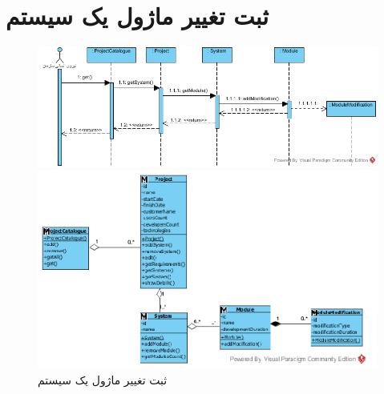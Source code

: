 \section{ثبت تغییر ماژول یک سیستم}
\begin{figure}[H]
	\centering
	\includegraphics[scale=0.8]{img/sequence-analysis/AddModuleModification}
	
	
	\includegraphics[scale=1]{img/sequence-analysis/AddModuleModificationC}
	\caption{ثبت تغییر ماژول یک سیستم}
\end{figure}


